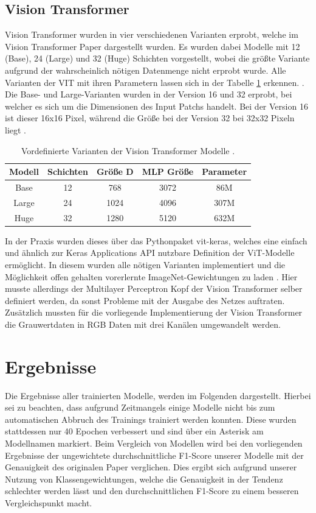 \documentclass[twoside,a4paper]{IEEEtran}
\begin{document}
\subsection{Vision Transformer} %
Vision Transformer wurden in vier verschiedenen Varianten erprobt, welche im Vision Transformer Paper dargestellt wurden. Es wurden dabei Modelle mit 12 (Base), 24 (Large) und 32 (Huge) Schichten vorgestellt, wobei die größte Variante aufgrund der wahrscheinlich nötigen Datenmenge nicht erprobt wurde. Alle Varianten der VIT mit ihren Parametern lassen sich in der Tabelle \ref{vit_sizes} erkennen. \cite[S.5]{VIT}. Die Base- und Large-Varianten wurden in der Version 16 und 32 erprobt, bei welcher es sich um die Dimensionen des Input Patchs handelt. Bei der Version 16 ist dieser 16x16 Pixel, während die Größe bei der Version 32 bei 32x32 Pixeln liegt \cite[S.5]{VIT}.
\begin{table}[!htb]
	\caption{Vordefinierte Varianten der Vision Transformer Modelle \cite[S.5]{VIT}.}
	\label{vit_sizes}
	\centering
	\begin{tabular}{|c|c|c|c|c|}
		\hline
		Modell & Schichten & Größe D & MLP Größe & Parameter\\
		\hline
		\hline
		Base & 12 & 768 & 3072 & 86M\\
		\hline
		Large & 24 & 1024 & 4096 & 307M\\
		\hline
		Huge & 32 & 1280 & 5120 & 632M\\
		\hline 
	\end{tabular}
\end{table}
In der Praxis wurden dieses über das Pythonpaket vit-keras, welches eine einfach und ähnlich zur Keras Applications API nutzbare Definition der ViT-Modelle ermöglicht. In diesem wurden alle nötigen Varianten implementiert und die Möglichkeit offen gehalten vorerlernte ImageNet-Gewichtungen zu laden \cite{git_vit}. Hier musste allerdings der Multilayer Perceptron Kopf der Vision Transformer selber definiert werden, da sonst Probleme mit der Ausgabe des Netzes auftraten. Zusätzlich mussten für die vorliegende Implementierung der Vision Transformer die Grauwertdaten in RGB Daten mit drei Kanälen umgewandelt werden. 
\section{Ergebnisse} %
Die Ergebnisse aller trainierten Modelle, werden im Folgenden dargestellt. Hierbei sei zu beachten, dass aufgrund Zeitmangels einige Modelle nicht bis zum automatischen Abbruch des Trainings trainiert werden konnten. Diese wurden stattdessen nur 40 Epochen verbessert und sind über ein Asterisk am Modellnamen markiert. Beim Vergleich von Modellen wird bei den vorliegenden Ergebnisse der ungewichtete durchschnittliche F1-Score unserer Modelle mit der Genauigkeit des originalen Paper verglichen. Dies ergibt sich aufgrund unserer Nutzung von Klassengewichtungen, welche die Genauigkeit in der Tendenz schlechter werden lässt und den durchschnittlichen F1-Score zu einem besseren Vergleichspunkt macht. 
\end{document}

